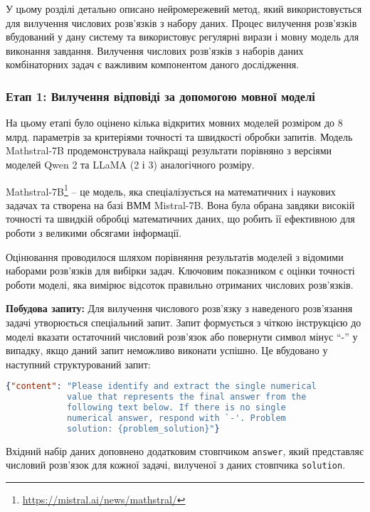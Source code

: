 У цьому розділі детально описано нейромережевий метод, який використовується для вилучення числових розв'язків з набору даних. Процес вилучення розв'язків вбудований у дану систему та використовує регулярні вирази і мовну модель для виконання завдання. Вилучення числових розв'язків з наборів даних комбінаторних задач є важливим компонентом даного дослідження. 

\subsubsection{Етап 1: Вилучення відповіді за допомогою мовної моделі}

На цьому етапі було оцінено кілька відкритих мовних моделей розміром до 8 млрд. параметрів за критеріями точності та швидкості обробки запитів. Модель Mathstral-7B продемонструвала найкращі результати порівняно з версіями моделей Qwen 2 та LLaMA (2 і 3) аналогічного розміру.  

Mathstral-7B\footnote{\url{https://mistral.ai/news/mathstral/}} -- це модель, яка спеціалізується на математичних і наукових задачах та створена на базі ВММ Mistral-7B. Вона була обрана завдяки високій точності та швидкій обробці математичних даних, що робить її ефективною для роботи з великими обсягами інформації.

Оцінювання проводилося шляхом порівняння результатів моделей з відомими наборами розв'язків для вибірки задач. Ключовим показником є оцінки точності роботи моделі, яка вимірює відсоток правильно отриманих числових розв'язків.

\textbf{Побудова запиту:} Для вилучення числового розв'язку з наведеного розв'язання задачі утворюється спеціальний запит. Запит формується з чіткою інструкцією до моделі вказати остаточний числовий розв'язок або повернути символ мінус ``-'' у випадку, якщо даний запит неможливо виконати успішно. Це вбудовано у наступний структурований запит:

\begin{lstlisting}[language=json, breaklines=true]
{"content": "Please identify and extract the single numerical 
            value that represents the final answer from the
            following text below. If there is no single 
            numerical answer, respond with `-'. Problem    
            solution: {problem_solution}"}
\end{lstlisting}

Вхідний набір даних доповнено додатковим стовпчиком \texttt{answer}, який представляє числовий розв'язок для кожної задачі, вилученої з даних стовпчика \texttt{solution}.

